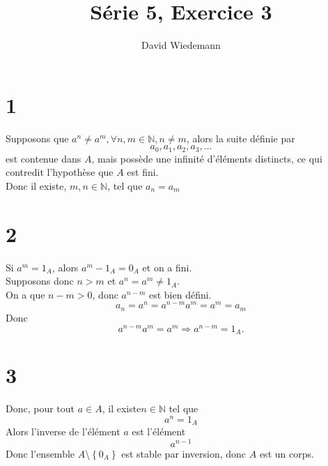 \documentclass[11pt, a4paper, twoside]{article}
\begin{document}
\title{Série 5, Exercice 3}
\author{David Wiedemann}
\maketitle
\section*{1}
Supposons que $a^{n}\neq a^{m}, \forall n, m \in \mathbb{N}, n\neq m$, alors la suite définie par
\[ 
a_0,a_1,a_2,a_3,\ldots
\]
est contenue dans $A$, mais possède une infinité d'éléments distincts, ce qui contredit l'hypothèse que $A$ est fini.\\
Donc il existe, $m,n \in \mathbb{N} $, tel que $a_n=a_m$
\section*{2}
Si $a^{m}=1_A$, alors $a^{m}-1_A = 0_A$ et on a fini.\\
Supposons donc $n>m$ et $a^{n}=a^{m}\neq 1_A$.\\
On a que $n-m>0$, donc $a^{n-m}$ est bien défini.\\
\[ 
a_n = a^{n} = a^{n-m} a^{m} = a^{m} = a_m
\]
Donc 
\[ 
a^{n-m}a^{m} = a^{m} \Rightarrow a^{n-m} = 1_A.
\]
\section*{3}
Donc, pour tout $a \in A$, il existe$ n \in \mathbb{N}$ tel que
\[ 
a^{n}= 1_A
\]
Alors l'inverse de l'élément $a$ est l'élément
\[ 
a^{n-1}
\]
Donc l'ensemble $A\setminus \left\{ 0_A \right\} $ est stable par inversion, donc $A$ est un corps.
\end{document}
